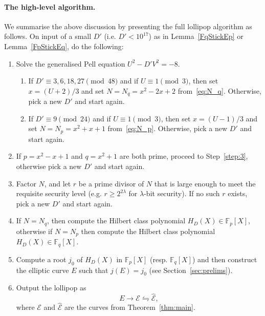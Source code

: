 \documentclass[version=preprint]{iacrcc}
\newcommand{\F}{\mathbb{F}}
\newcommand{\EC}{\mathcal{E}}
\begin{document}
\paragraph{The high-level algorithm.} We summarise the above discussion by presenting the full lollipop algorithm as follows. On input of a small $D'$ (i.e. $D'<10^{17}$) as in Lemma~\ref{FqStickEp} or Lemma~\ref{FpStickEq}, do the following: 
\begin{enumerate}
\item \label{step:1} Solve the generalised Pell equation $U^2-D'V^2=-8$. 
\begin{enumerate}
\item If $D' \equiv 3,6,18,27 \pmod{48}$ and if $U \equiv 1 \pmod{3}$, then set $x = (U+2)/3$ and set $N=N_q=x^2-2x+2$ from~\eqref{eq:N_q}. Otherwise, pick a new $D'$ and start again. 
\item If $D' \equiv 9 \pmod{24}$ and if $U \equiv 1 \pmod{3}$, then set $x = (U-1)/3$ and set $N=N_p=x^2+x+1$ from~\eqref{eq:N_p}. Otherwise, pick a new $D'$ and start again.
\end{enumerate}
\item   \label{step:2} If $p=x^2-x+1$ and $q=x^2+1$ are both prime, proceed to Step~\ref{step:3}, otherwise pick a new $D'$ and start again. 
\item \label{step:3} Factor $N$, and let $r$ be a prime divisor of $N$ that is large enough to meet the requisite security level (e.g. $r \geq 2^{2\lambda}$ for $\lambda$-bit security). If no such $r$ exists, pick a new $D'$ and start again. 
\item \label{step:4} If $N=N_q$, then compute the Hilbert class polynomial $H_D(X) \in \F_p[X]$, otherwise if $N=N_p$ then compute the Hilbert class polynomial $H_D(X) \in \F_q[X]$. 
\item \label{step:5} Compute a root $j_0$ of $H_D(X)$ in $\F_p[X]$ (resp. $\F_q[X]$) and then construct the elliptic curve $E$ such that $j(E)=j_0$ (see Section~\ref{sec:prelims}).
\item \label{step:6} Output the lollipop as 
\[
E \rightarrow \EC \leftrightharpoons \hat{\EC}, 
\] 
where $\EC$ and $\hat{\EC}$ are the curves from Theorem~\ref{thm:main}.

\end{enumerate}
\end{document}
